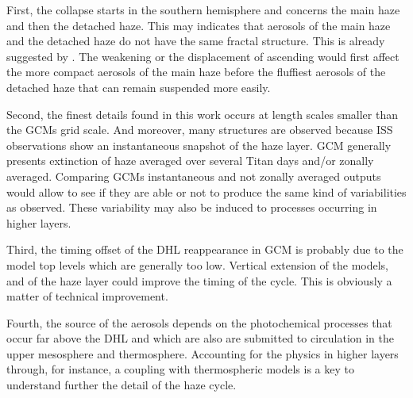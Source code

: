 First, the collapse starts in the southern hemisphere and concerns the main haze and then the detached haze. This
may indicates that aerosols of the main haze and the detached haze do not have the same fractal structure. This is
already suggested by \cite{Larson2015}. The weakening or the displacement of ascending would first affect the more
compact aerosols of the main haze before the fluffiest aerosols of the detached haze that can remain suspended more
easily.

Second, the finest details found in this work occurs at length scales smaller than the GCMs grid scale. And moreover,
many structures are observed because ISS observations show an instantaneous snapshot of the haze layer. GCM generally
presents extinction of haze averaged over several Titan days and/or zonally averaged. Comparing GCMs instantaneous and
not zonally averaged outputs would allow to see if they are able or not to produce the same kind of variabilities as
observed. These variability may also be induced to processes occurring in higher layers.

Third, the timing offset of the DHL reappearance in GCM is probably due to the model top levels which are generally too
low. Vertical extension of the models, and of the haze layer could improve the timing of the cycle. This is obviously
a matter of technical improvement.

Fourth, the source of the aerosols depends on the photochemical processes that occur far above the DHL and which are
also are submitted to circulation in the upper mesosphere and thermosphere. Accounting for the physics in higher layers
through, for instance, a coupling with thermospheric models is a key to understand further the detail of the haze cycle.

